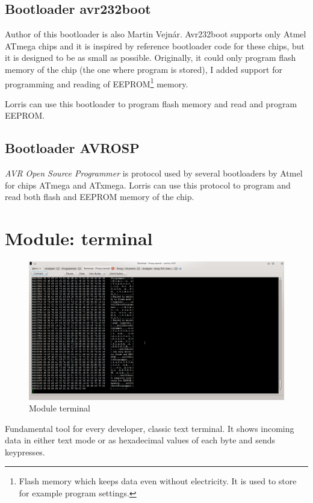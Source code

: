 \documentclass[12pt, a4paper, oneside]{article}
\newcommand{\It}{\textit}  %
\begin{document}
\subsection{Bootloader avr232boot}
Author of this bootloader is also Martin Vejnár. Avr232boot supports only Atmel ATmega chips and it is inspired by reference bootloader code for these chips, but it is designed to be as small as possible. Originally, it could only program flash memory of the chip (the one where program is stored), I added support for programming and reading of EEPROM\footnote{Flash memory which keeps data even without electricity. It is used to store for example program settings.} memory.

Lorris can use this bootloader to program flash memory and read and program EEPROM.

\subsection{Bootloader AVROSP}
\It{AVR Open Source Programmer} is protocol used by several bootloaders by Atmel for chips ATmega and ATxmega. Lorris can use this protocol to program and read both flash and EEPROM memory of the chip.

\newpage
\section{Module: terminal}
\begin{figure}[H]
\begin{center}
\includegraphics[width=\textwidth]{img/terminal.png}
\caption{Module terminal}
\label{Terminal}
\end{center}
\end{figure}
Fundamental tool for every developer, classic text terminal. It shows incoming data in either text mode or as hexadecimal values of each byte and sends keypresses.
\end{document}
